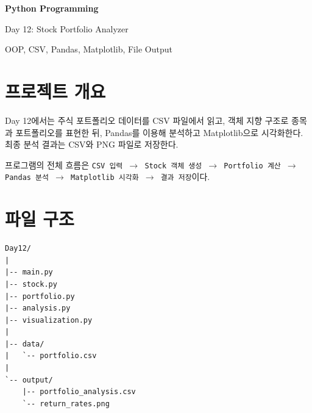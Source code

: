 \documentclass[11pt,a4paper]{article}
\begin{document}
\begin{titlepage}
    \centering
    \vspace*{3cm}

    {\Huge\bfseries Python Programming\par}
    \vspace{0.8cm}
    {\LARGE Day 12: Stock Portfolio Analyzer\par}

    \vspace{2cm}

    {\large OOP, CSV, Pandas, Matplotlib, File Output\par}

    \vfill
\end{titlepage}

\tableofcontents
\newpage

\section{프로젝트 개요}

\begin{learningbox}
Day 12에서는 주식 포트폴리오 데이터를 CSV 파일에서 읽고, 객체 지향 구조로 종목과 포트폴리오를 표현한 뒤, Pandas를 이용해 분석하고 Matplotlib으로 시각화한다. 최종 분석 결과는 CSV와 PNG 파일로 저장한다.
\end{learningbox}

\begin{importantbox}
프로그램의 전체 흐름은 \texttt{CSV 입력 $\rightarrow$ Stock 객체 생성 $\rightarrow$ Portfolio 계산 $\rightarrow$ Pandas 분석 $\rightarrow$ Matplotlib 시각화 $\rightarrow$ 결과 저장}이다.
\end{importantbox}

\section{파일 구조}

\begin{practicebox}
\begin{verbatim}
Day12/
|
|-- main.py
|-- stock.py
|-- portfolio.py
|-- analysis.py
|-- visualization.py
|
|-- data/
|   `-- portfolio.csv
|
`-- output/
    |-- portfolio_analysis.csv
    `-- return_rates.png
\end{verbatim}
\end{practicebox}
\end{document}
